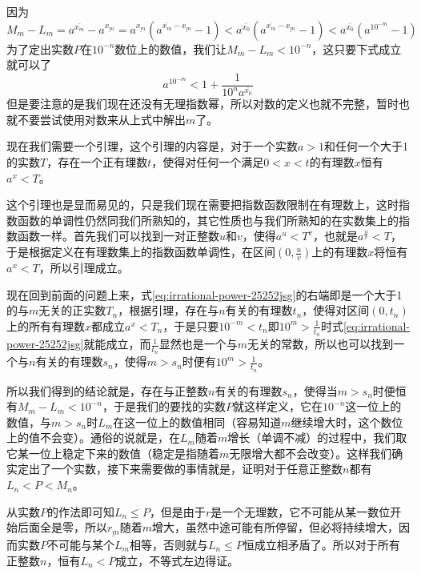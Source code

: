 因为
\begin{equation*}
  M_m-L_m = a^{\overline{x_m}}-a^{\underline{x_m}}
  = a^{\underline{x_m}}(a^{\overline{x_m}-\underline{x_m}}-1)
  < a^{\overline{x_0}}(a^{\overline{x_m}-\underline{x_m}}-1)
  < a^{\overline{x_0}}(a^{10^{-m}}-1)
\end{equation*}
为了定出实数$P$在$10^{-n}$数位上的数值，我们让$M_m-L_m<10^{-n}$，这只要下式成立就可以了
\begin{equation}
  \label{eq:irrational-power-25252jsg}
  a^{10^{-m}} < 1 + \frac{1}{10^na^{\overline{x_0}}}
\end{equation}
但是要注意的是我们现在还没有无理指数幂，所以对数的定义也就不完整，暂时也就不要尝试使用对数来从上式中解出$m$了。

现在我们需要一个引理，这个引理的内容是，对于一个实数$a>1$和任何一个大于1的实数$T$，存在一个正有理数$t$，使得对任何一个满足$0<x<t$的有理数$x$恒有$a^x<T$。

这个引理也是显而易见的，只是我们现在需要把指数函数限制在有理数上，这时指数函数的单调性仍然同我们所熟知的，其它性质也与我们所熟知的在实数集上的指数函数一样。首先我们可以找到一对正整数$u$和$v$，使得$a^u<T^v$，也就是$a^{\frac{u}{v}}<T$，于是根据定义在有理数集上的指数函数单调性，在区间$(0,\frac{u}{v})$上的有理数$x$将恒有$a^x<T$，所以引理成立。

现在回到前面的问题上来，式\ref{eq:irrational-power-25252jsg}的右端即是一个大于1的与$m$无关的正实数$T_n$，根据引理，存在与$n$有关的有理数$t_n$，使得对区间$(0,t_n)$上的所有有理数$x$都成立$a^x<T_n$，于是只要$10^{-m}<t_n$即$10^m>\frac{1}{t_n}$时式\ref{eq:irrational-power-25252jsg}就能成立，而$\frac{1}{t_n}$显然也是一个与$m$无关的常数，所以也可以找到一个与$n$有关的有理数$s_n$，使得$m>s_n$时便有$10^m>\frac{1}{t_n}$。

所以我们得到的结论就是，存在与正整数$n$有关的有理数$s_n$，使得当$m>s_n$时便恒有$M_m-L_m<10^{-n}$，于是我们的要找的实数$P$就这样定义，它在$10^{-n}$这一位上的数值，与$m>s_n$时$L_m$在这一位上的数值相同（容易知道$m$继续增大时，这个数位上的值不会变）。通俗的说就是，在$L_m$随着$m$增长（单调不减）的过程中，我们取它某一位上稳定下来的数值（稳定是指随着$m$无限增大都不会改变）。这样我们确实定出了一个实数，接下来需要做的事情就是，证明对于任意正整数$n$都有$L_n<P<M_n$。

从实数$P$的作法即可知$L_n \leqslant P$，但是由于$r$是一个无理数，它不可能从某一数位开始后面全是零，所以$\underline{r_m}$随着$m$增大，虽然中途可能有所停留，但必将持续增大，因而实数$P$不可能与某个$L_m$相等，否则就与$L_n \leqslant P$恒成立相矛盾了。所以对于所有正整数$n$，恒有$L_n < P$成立，不等式左边得证。

